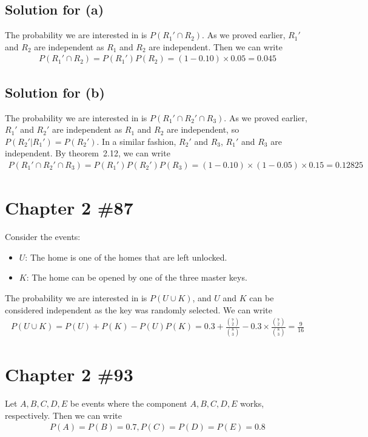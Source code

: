 \documentclass{scrartcl}
\begin{document}
\subsection{Solution for (a)}
The probability we are interested in is \(P(R_1' \cap R_2)\). As we proved
earlier, \(R_1'\) and \(R_2\) are independent as \(R_1\) and \(R_2\) are
independent. Then we can write
\begin{align*}
  P(R_1' \cap R_2) = P(R_1')P(R_2) = (1 - 0.10) \times 0.05 = 0.045
\end{align*}

\subsection{Solution for (b)}
The probability we are interested in is \(P(R_1' \cap R_2' \cap R_3)\). As we
proved earlier, \(R_1'\) and \(R_2'\) are independent as \(R_1\) and \(R_2\)
are independent, so \(P(R_2' | R_1') = P(R_2')\). In a similar fashion,
\(R_2'\) and \(R_3\), \(R_1'\) and \(R_3\) are independent. By theorem~2.12, we
can write
\begin{align*}
  P(R_1' \cap R_2' \cap R_3)
  = P(R_1')P(R_2')P(R_3)
  = (1 - 0.10) \times (1 - 0.05) \times 0.15
  = 0.12825
\end{align*}

\section{Chapter 2 \#87}
Consider the events:
\begin{itemize}
  \item \(U\): The home is one of the homes that are left unlocked.
  \item \(K\): The home can be opened by one of the three master keys.
\end{itemize}

The probability we are interested in is \(P(U \cup K)\), and \(U\) and \(K\)
can be considered independent as the key was randomly selected. We can write
\begin{align*}
  P(U \cup K)
  = P(U) + P(K) - P(U)P(K)
  = 0.3 + \frac{{7 \choose 2}}{{8 \choose 3}}
  - 0.3 \times \frac{{7 \choose 2}}{{8 \choose 3}}
  = \frac{9}{16}
\end{align*}

\section{Chapter 2 \#93}
Let \(A, B, C, D, E\) be events where the component \(A, B, C, D, E\) works,
respectively. Then we can write
\begin{align*}
  P(A) = P(B) = 0.7, P(C) = P(D) = P(E) = 0.8
\end{align*}
\end{document}
